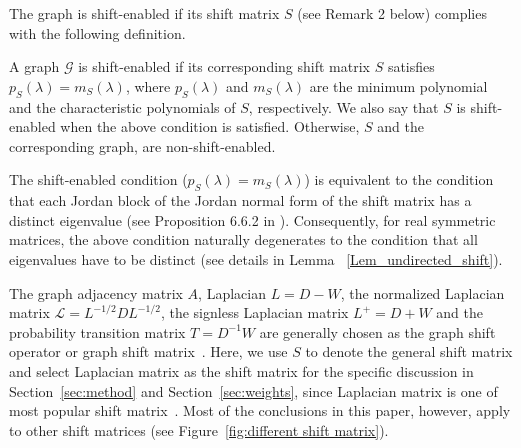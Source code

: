 \documentclass[journal]{IEEEtran}
\begin{document}


The graph is shift-enabled if its shift matrix $S$ (see Remark 2 below) complies with the following definition.


\begin{myDef}
	\label{def:shift_enable}
	A graph ${\mathcal G}$ is shift-enabled if its corresponding shift matrix $S$ satisfies $p_S(\lambda) =m_S(\lambda)$, where $p_S(\lambda)$ and $m_S(\lambda)$ are the minimum polynomial and the characteristic polynomials of $S$, respectively. We also say that $S$ is shift-enabled when the above condition is satisfied. Otherwise, $S$ and the corresponding graph, are non-shift-enabled.
\end{myDef}

\begin{Rem}
The shift-enabled condition ($p_S(\lambda) =m_S(\lambda)$) is equivalent to the condition that each Jordan block of the Jordan normal form of the shift matrix has a distinct eigenvalue (see Proposition 6.6.2 in \cite{lancaster_1985_matrix_theory}).
Consequently, for real symmetric matrices, the above condition naturally degenerates to the condition that all eigenvalues have to be distinct (see details in Lemma  ~\ref{Lem_undirected_shift}).
\end{Rem}

\begin{Rem}
The graph adjacency matrix $A$, %
Laplacian $L=D-W$,  the normalized Laplacian matrix $\mathcal{L}=L^{-1/2} D L^{-1/2}$, the signless Laplacian matrix $L^{+}=D+W$  and the probability transition matrix $T=D^{-1}W$ are generally chosen as the graph shift operator or graph shift matrix~\cite{sandryhaila_2014_big_data, sandryhaila_2014_discrete_frequency,Shuman_2013_The_emerging_field,Marques_2017}. Here,  we use $S$ to denote the general
shift matrix 
and select Laplacian matrix as the shift matrix for the specific discussion in Section~\ref{sec:method} and Section~\ref{sec:weights}, since
Laplacian matrix is one of most popular shift matrix~\cite{Marques_2017,dong2020graph,Dittrich20200signedgraph}. %
Most of the conclusions in this paper, however, apply to other shift matrices (see Figure~\ref{fig:different shift matrix}).
\end{Rem}
\end{document}
